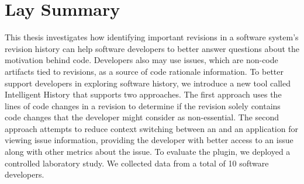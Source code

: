 

\chapter{Lay Summary}

This thesis investigates how identifying important revisions in a software system's revision history can help 
software developers to better answer questions about the motivation behind code.
Developers also may use issues, which are non-code artifacts tied to revisions, 
as a source of code rationale information.
To better support developers in exploring software history, 
we introduce a new tool called Intelligent History that supports two approaches.
The first approach uses the lines of code changes in a revision
to determine if the revision solely contains code changes that the developer
might consider as non-essential.
The second approach attempts to reduce context switching between an 
and an application for viewing issue information, providing the developer with
better access to an issue along with other metrics about the issue.
To evaluate the plugin, we deployed a controlled laboratory study.
We collected data from a total of 10 software developers.